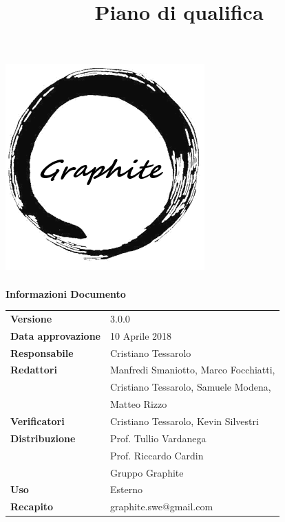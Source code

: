 \documentclass[openany,12pt,a4paper]{report}
\title{Piano di qualifica}
\author{}
\newcommand{\versione}{3.0.0}
\begin{document}
	\makeatletter
	\begin{titlepage}
		\setlength{\headsep}{0pt}  
		\begin{center}
			\includegraphics[width=0.5\linewidth]{img/logo.png}\\[1em]
			{\huge \bfseries  \@title }\\[10ex]
			\textbf{\Large Informazioni Documento} \\[2em]
			\bgroup
			\def\arraystretch{1.5}
			\begin{tabular}{l|l}
				\textbf{Versione} & \versione{} \\
				\textbf{Data approvazione} & 10 Aprile 2018 \\
				\textbf{Responsabile} & Cristiano Tessarolo\\
				\textbf{Redattori} &  Manfredi Smaniotto, Marco Focchiatti,\\
				& Cristiano Tessarolo, Samuele Modena, \\
				& Matteo Rizzo \\
				\textbf{Verificatori} & Cristiano Tessarolo, Kevin Silvestri \\
				\textbf{Distribuzione} & Prof. Tullio Vardanega \\
				 & Prof. Riccardo Cardin \\
				 & Gruppo Graphite \\
				\textbf{Uso} & Esterno \\
				\textbf{Recapito} & graphite.swe@gmail.com \\
			\end{tabular}
		\egroup
		\end{center}
	\end{titlepage}
	\makeatother
 
\thispagestyle{empty}
\newpage

\end{document}
